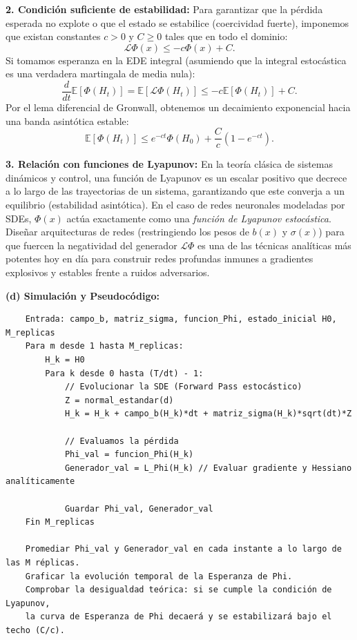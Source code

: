 \documentclass[11pt, letterpaper]{article}
\begin{document}
\begin{solucion}
    \textbf{2. Condición suficiente de estabilidad:}
    Para garantizar que la pérdida esperada no explote o que el estado se estabilice (coercividad fuerte), imponemos que existan constantes $c > 0$ y $C \ge 0$ tales que en todo el dominio:
    \[ \mathcal{L}\Phi(x) \le -c \Phi(x) + C. \]
    Si tomamos esperanza en la EDE integral (asumiendo que la integral estocástica es una verdadera martingala de media nula):
    \[ \frac{d}{dt}\mathbb{E}[\Phi(H_t)] = \mathbb{E}[\mathcal{L}\Phi(H_t)] \le -c \mathbb{E}[\Phi(H_t)] + C. \]
    Por el lema diferencial de Gronwall, obtenemos un decaimiento exponencial hacia una banda asintótica estable:
    \[ \mathbb{E}[\Phi(H_t)] \le e^{-ct} \Phi(H_0) + \frac{C}{c}(1 - e^{-ct}). \]

    \textbf{3. Relación con funciones de Lyapunov:}
    En la teoría clásica de sistemas dinámicos y control, una función de Lyapunov es un escalar positivo que decrece a lo largo de las trayectorias de un sistema, garantizando que este converja a un equilibrio (estabilidad asintótica).
    En el caso de redes neuronales modeladas por SDEs, $\Phi(x)$ actúa exactamente como una \textit{función de Lyapunov estocástica}. Diseñar arquitecturas de redes (restringiendo los pesos de $b(x)$ y $\sigma(x)$) para que fuercen la negatividad del generador $\mathcal{L}\Phi$ es una de las técnicas analíticas más potentes hoy en día para construir redes profundas inmunes a gradientes explosivos y estables frente a ruidos adversarios.

    \textbf{(d) Simulación y Pseudocódigo:}
    \begin{verbatim}
    Entrada: campo_b, matriz_sigma, funcion_Phi, estado_inicial H0, M_replicas
    Para m desde 1 hasta M_replicas:
        H_k = H0
        Para k desde 0 hasta (T/dt) - 1:
            // Evolucionar la SDE (Forward Pass estocástico)
            Z = normal_estandar(d)
            H_k = H_k + campo_b(H_k)*dt + matriz_sigma(H_k)*sqrt(dt)*Z
            
            // Evaluamos la pérdida
            Phi_val = funcion_Phi(H_k)
            Generador_val = L_Phi(H_k) // Evaluar gradiente y Hessiano analíticamente
            
            Guardar Phi_val, Generador_val
    Fin M_replicas
    
    Promediar Phi_val y Generador_val en cada instante a lo largo de las M réplicas.
    Graficar la evolución temporal de la Esperanza de Phi.
    Comprobar la desigualdad teórica: si se cumple la condición de Lyapunov, 
    la curva de Esperanza de Phi decaerá y se estabilizará bajo el techo (C/c).
    \end{verbatim}
\end{solucion}
\end{document}
